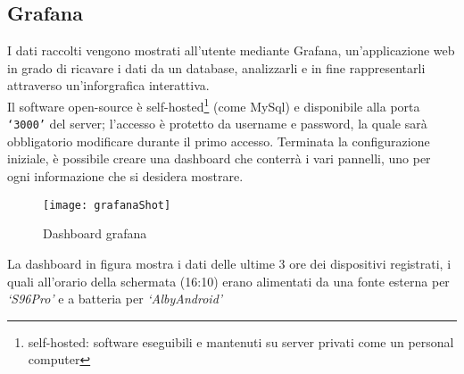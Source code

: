 \documentclass[target=bach]{thud}
\begin{document}
            \subsection{Grafana}

                    I dati raccolti vengono mostrati all'utente mediante Grafana, un'applicazione web in grado di ricavare i dati da un database, analizzarli e in fine rappresentarli attraverso un'inforgrafica interattiva.\\
                    Il software open-source è self-hosted\footnote[1]{self-hosted: software eseguibili e mantenuti su server privati come un personal computer} (come MySql) e disponibile alla porta \texttt{`3000'} del server; l'accesso è protetto da username e password, la quale sarà obbligatorio modificare durante il primo accesso.
                    Terminata la configurazione iniziale, è possibile creare una dashboard che conterrà i vari pannelli, uno per ogni informazione che si desidera mostrare.

                    \graphicspath{ {./img/} }
                    \begin{figure}[h]
                        \centering
                        \texttt{[image: grafanaShot]}
                        \caption{Dashboard grafana}
                        \label{fig:Infografica di Grafana }

                    \end{figure}
                    La dashboard in figura mostra i dati delle ultime 3 ore dei dispositivi registrati, i quali all'orario della schermata (16:10) erano alimentati da una fonte esterna per \textit{`S96Pro'} e a batteria per \textit{`AlbyAndroid'}
\newline
\end{document}
